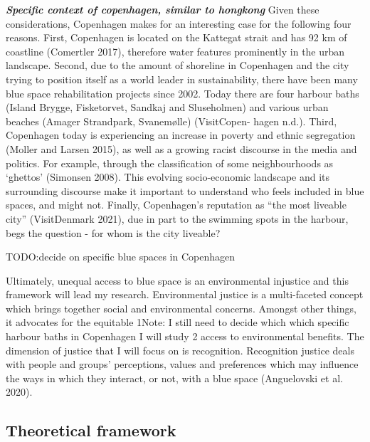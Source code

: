 \documentclass{article}
\newcommand{\bisection}[1]{\textbf{\textit{#1}}}
\begin{document}
\bisection{Specific context of copenhagen, similar to hongkong}
Given these considerations, Copenhagen makes for an interesting case for the following four reasons. First, Copenhagen is located on the Kattegat strait and has 92 km of coastline (Comertler 2017), therefore water features prominently in the urban landscape. Second, due to the amount of shoreline in Copenhagen and the city trying to position itself as a world leader in sustainability, there have been many blue space rehabilitation projects since 2002. Today there are four harbour baths (Island Brygge, Fisketorvet, Sandkaj and Sluseholmen) and various urban beaches (Amager Strandpark, Svanemølle) (VisitCopen- hagen n.d.). Third, Copenhagen today is experiencing an increase in poverty and ethnic segregation (Moller and Larsen 2015), as well as a growing racist discourse in the media and politics. For example, through the classification of some neighbourhoods as ‘ghettos’ (Simonsen 2008). This evolving socio-economic landscape and its surrounding discourse make it important to understand who feels included in blue spaces, and might not. Finally, Copenhagen’s reputation as “the most liveable city” (VisitDenmark 2021), due in part to the swimming spots in the harbour, begs the question - for whom is the city liveable?

TODO:decide on specific blue spaces in Copenhagen



Ultimately, unequal access to blue space is an environmental injustice and this framework will lead my research. Environmental justice is a multi-faceted concept which brings together social and environmental concerns. Amongst other things, it advocates for the equitable
1Note: I still need to decide which which specific harbour baths in Copenhagen I will study
 2
access to environmental benefits. The dimension of justice that I will focus on is recognition. Recognition justice deals with people and groups’ perceptions, values and preferences which may influence the ways in which they interact, or not, with a blue space (Anguelovski et al. 2020).


\subsection{Theoretical framework}
\end{document}

